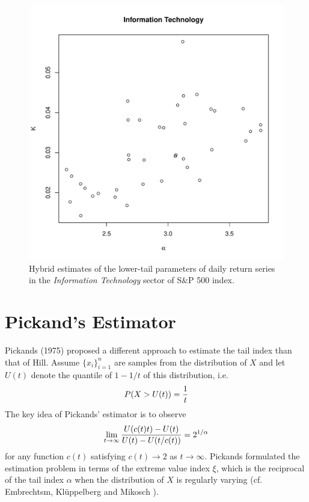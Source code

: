 \documentclass{article}
\newcommand{\1}[1]{
  \mathbf{1}_{\{#1\}}
}
\begin{document}
\begin{figure}[htb!]
  \centering
  \includegraphics[width=\textwidth]{Information_Technology_alpha_K.pdf}
  \caption{Hybrid estimates of the lower-tail parameters of daily
    return series in the {\it Information Technology} sector of S\&P
    500 index.
  }
  \label{fig:Information_Technology_alpha_K}
\end{figure}


\section{Pickand's Estimator}
Pickands (1975) \cite{pickands1975statistical} proposed a different
approach to estimate the tail index than that of Hill. Assume
$\{x_i\}_{i=1}^n$ are samples from the distribution of $X$ and let $U(t)$
denote the quantile of $1 - 1/t$ of this distribution, i.e.
\[
P(X > U(t)) = {1 \over t}
\]
The key idea of Pickands' estimator is to observe
\[
\lim_{t \to \infty} {
  U(c(t) t) - U(t)
  \over
  U(t) - U(t/c(t))
} = 2^{1/\alpha}
\]
for any function $c(t)$ satisfying $c(t) \to 2$ as $t \to \infty$.
Pickands formulated the estimation problem in terms of the extreme
value index $\xi$, which is the reciprocal of the tail index $\alpha$
when the distribution of $X$ is regularly varying (cf. Embrechtsm,
Kl\"uppelberg and Mikosch \cite{Embrechts1997}).
\end{document}
